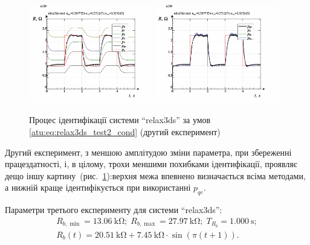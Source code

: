 \begin{figure}[htb!]
  \centerline{
    \includegraphics[width=0.48\textwidth]{p/relax3ds_read_id2_1-p_p.png}
    \hfill
    \includegraphics[width=0.48\textwidth]{p/relax3ds_read_id2_1-p_pp.png}
  }
 \caption{Процес ідентифікації системи ``relax3ds'' за умов \ref{atu:eq:relax3ds_test2_cond} (другий експеримент)}
  \label{atu:f:relax3ds_id_1}
\end{figure}

Другий експеримент, з меншою амплітудою зміни параметра,
при збереженні працездатності, і, в цілому, трохи
меншими похибками ідентифікації, проявляє дещо іншу
картину~(рис.~\ref{atu:f:relax3ds_id_1}):верхня межа впевнено визначається
всіма методами, а нижній краще ідентифікується при використанні
$p_{qe} $.


Параметри третього експерименту для системи ``relax3ds'':
%
\begin{equation}
  \begin{array}{c}
    R_{b,\min} = \SI{13.06}{\kilo\ohm};
    \;
    R_{b,\max} = \SI{27.97}{\kilo\ohm};
    \;
    T_{R_b} = \SI{1.000}{\second};
  \\
    R_b(t) = \SI{20.51}{\kilo\ohm} + \SI{7.45}{\kilo\ohm} \cdot \sin( \pi ( t + 1 ) ).
  \end{array}
  \label{atu:eq:relax3ds_test3_cond}
\end{equation}

